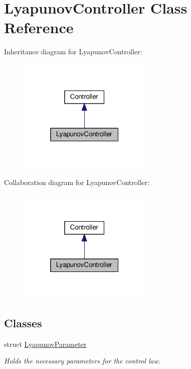 \hypertarget{classLyapunovController}{}\section{Lyapunov\+Controller Class Reference}
\label{classLyapunovController}


Inheritance diagram for Lyapunov\+Controller\+:\nopagebreak
\begin{figure}[H]
\begin{center}
\leavevmode
\includegraphics[width=181pt]{d9/d75/classLyapunovController__inherit__graph}
\end{center}
\end{figure}


Collaboration diagram for Lyapunov\+Controller\+:\nopagebreak
\begin{figure}[H]
\begin{center}
\leavevmode
\includegraphics[width=181pt]{de/de2/classLyapunovController__coll__graph}
\end{center}
\end{figure}
\subsection*{Classes}
\begin{DoxyCompactItemize}
\item 
struct \hyperlink{structLyapunovController_1_1LyapunovParameter}{Lyapunov\+Parameter}
\begin{DoxyCompactList}\small\item\em Holds the necessary parameters for the control law. \end{DoxyCompactList}\end{DoxyCompactItemize}

